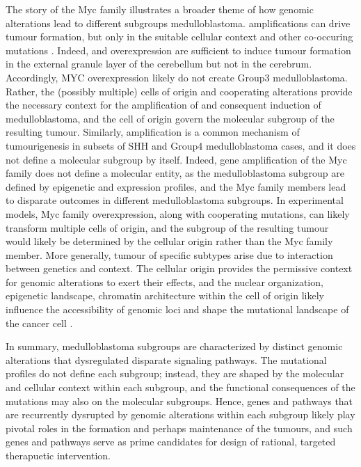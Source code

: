 The story of the Myc family illustrates a broader theme of how genomic alterations lead to different subgroups medulloblastoma.  amplifications can drive tumour formation, but only in the suitable cellular context and other co-occuring mutations . Indeed,  and  overexpression are sufficient to induce tumour formation in the external granule layer of the cerebellum but not in the cerebrum. Accordingly, MYC overexpression likely do not create Group3 medulloblastoma. Rather, the (possibly multiple) cells of origin and cooperating alterations provide the necessary context for the amplification of  and consequent induction of medulloblastoma, and the cell of origin govern the molecular subgroup of the resulting tumour. Similarly,  amplification is a common mechanism of tumourigenesis in subsets of SHH and Group4 medulloblastoma cases, and it does not define a molecular subgroup by itself. Indeed, gene amplification of the Myc family does not define a molecular entity, as the medulloblastoma subgroup are defined by epigenetic and expression profiles, and the Myc family members lead to disparate outcomes in different medulloblastoma subgroups. In experimental models, Myc family overexpression, along with cooperating mutations, can likely transform multiple cells of origin, and the subgroup of the resulting tumour would likely be determined by the cellular origin rather than the Myc family member. More generally, tumour of specific subtypes arise due to interaction between genetics and context. The cellular origin provides the permissive context for genomic alterations to exert their effects, and the nuclear organization, epigenetic landscape, chromatin architecture within the cell of origin likely influence the accessibility of genomic loci and shape the mutational landscape of the cancer cell .

In summary, medulloblastoma subgroups are characterized by distinct genomic alterations that dysregulated disparate signaling pathways. The mutational profiles do not define each subgroup; instead, they are shaped by the molecular and cellular context within each subgroup, and the functional consequences of the mutations may also on the molecular subgroups. Hence, genes and pathways that are recurrently dysrupted by genomic alterations within each subgroup likely play pivotal roles in the formation and perhaps maintenance of the tumours, and such genes and pathways serve as prime candidates for design of rational, targeted therapuetic intervention.
